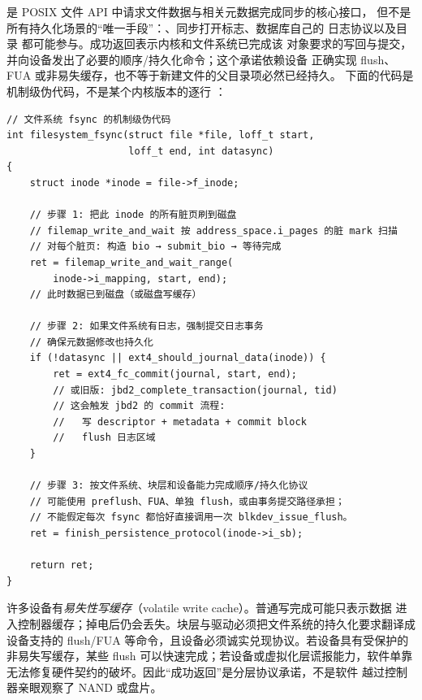\begin{filesystemlayout}

 是 POSIX 文件 API 中请求文件数据与相关元数据完成同步的核心接口，
但不是所有持久化场景的“唯一手段”：、同步打开标志、数据库自己的
日志协议以及目录  都可能参与。成功返回表示内核和文件系统已完成该
对象要求的写回与提交，并向设备发出了必要的顺序/持久化命令；这个承诺依赖设备
正确实现 flush、FUA 或非易失缓存，也不等于新建文件的父目录项必然已经持久。
下面的代码是机制级伪代码，不是某个内核版本的逐行 ：

\begin{lstlisting}
// 文件系统 fsync 的机制级伪代码
int filesystem_fsync(struct file *file, loff_t start,
                     loff_t end, int datasync)
{
    struct inode *inode = file->f_inode;

    // 步骤 1: 把此 inode 的所有脏页刷到磁盘
    // filemap_write_and_wait 按 address_space.i_pages 的脏 mark 扫描
    // 对每个脏页: 构造 bio → submit_bio → 等待完成
    ret = filemap_write_and_wait_range(
        inode->i_mapping, start, end);
    // 此时数据已到磁盘（或磁盘写缓存）

    // 步骤 2: 如果文件系统有日志，强制提交日志事务
    // 确保元数据修改也持久化
    if (!datasync || ext4_should_journal_data(inode)) {
        ret = ext4_fc_commit(journal, start, end);
        // 或旧版: jbd2_complete_transaction(journal, tid)
        // 这会触发 jbd2 的 commit 流程:
        //   写 descriptor + metadata + commit block
        //   flush 日志区域
    }

    // 步骤 3: 按文件系统、块层和设备能力完成顺序/持久化协议
    // 可能使用 preflush、FUA、单独 flush，或由事务提交路径承担；
    // 不能假定每次 fsync 都恰好直接调用一次 blkdev_issue_flush。
    ret = finish_persistence_protocol(inode->i_sb);

    return ret;
}
\end{lstlisting}

\begin{warningbox}
许多设备有\emph{易失性写缓存}（volatile write cache）。普通写完成可能只表示数据
进入控制器缓存；掉电后仍会丢失。块层与驱动必须把文件系统的持久化要求翻译成
设备支持的 flush/FUA 等命令，且设备必须诚实兑现协议。若设备具有受保护的
非易失写缓存，某些 flush 可以快速完成；若设备或虚拟化层谎报能力，软件单靠
 无法修复硬件契约的破坏。因此“成功返回”是分层协议承诺，不是软件
越过控制器亲眼观察了 NAND 或盘片。
\end{warningbox}



\end{filesystemlayout}
